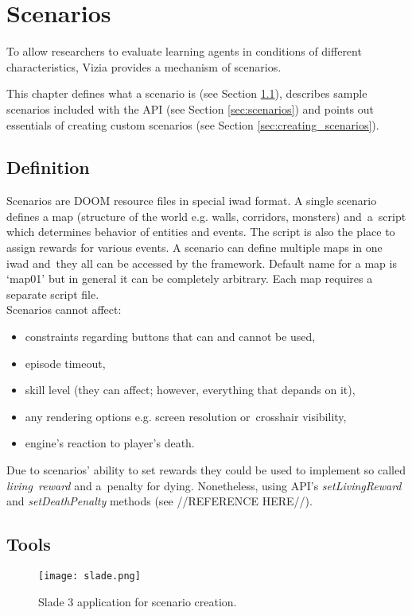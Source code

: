
\chapter{Scenarios}

To allow researchers to evaluate learning agents in conditions of different characteristics, Vizia provides a mechanism of scenarios.

This chapter defines what a scenario is (see Section \ref{sec:scenario_definition}), describes sample scenarios included with the API (see Section \ref{sec:scenarios}) and points out essentials of creating custom scenarios (see Section \ref{sec:creating_scenarios}).

\section{Definition}\label{sec:scenario_definition}
	Scenarios are DOOM resource files in special iwad format. A single scenario defines a map (structure of the world e.g. walls, corridors, monsters) and~a~script which determines behavior of entities and events. The script is also the place to assign rewards for various events. A scenario can define multiple maps in one iwad and~they all can be accessed by the framework. Default name for a map is `map01' but in general it can be completely arbitrary. Each map requires a separate script file.
	\\
	Scenarios cannot affect:
	\begin{itemize}
		\item constraints regarding buttons that can and cannot be used,
		\item episode timeout,
		\item skill level (they can affect; however, everything that depands on it),
		\item any rendering options e.g. screen resolution or~crosshair visibility,
		\item engine's reaction to player's death.
	\end{itemize}

	Due to scenarios' ability to set rewards they could be used to implement so called \emph{living~reward} and a~penalty for dying. Nonetheless, using API's \emph{setLivingReward} and \emph{setDeathPenalty} methods (see //REFERENCE HERE//).

\section{Tools}\label{sec:tools}
	\begin{figure}
			\centering
			\texttt{[image: slade.png]}
			\caption{Slade 3 application for scenario creation.}\label{fig:slade}
	\end{figure}

